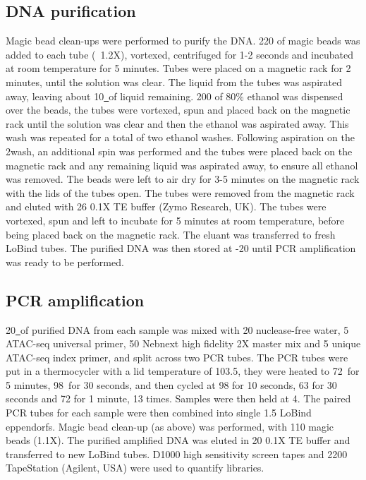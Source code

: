 \subsection{DNA purification}
Magic bead clean-ups were performed to purify the DNA.
220\ul{} of magic beads was added to each tube (~1.2X), vortexed, centrifuged for 1-2 seconds and incubated at room temperature for 5 minutes.
Tubes were placed on a magnetic rack for 2 minutes, until the solution was clear.
The liquid from the tubes was aspirated away, leaving about 10\ul\ of liquid remaining.
200\ul{} of 80\% ethanol was dispensed over the beads, the tubes were vortexed, spun and placed back on the magnetic rack until the solution was clear and then the ethanol was aspirated away.
This wash was repeated for a total of two ethanol washes.
Following aspiration on the 2\nd wash, an additional spin was performed and the tubes were placed back on the magnetic rack and any remaining liquid was aspirated away, to ensure all ethanol was removed.
The beads were left to air dry for 3-5 minutes on the magnetic rack with the lids of the tubes open.
The tubes were removed from the magnetic rack and eluted with 26\ul{} 0.1X TE buffer (Zymo Research, UK).
The tubes were vortexed, spun and left to incubate for 5 minutes at room temperature, before being placed back on the magnetic rack.
The eluant was transferred to fresh LoBind tubes.
The purified DNA was then stored at -20\C{} until PCR amplification was ready to be performed.

\subsection{PCR amplification}
20\ul\ of purified DNA from each sample was mixed with 20\ul{} nuclease-free water, 5\ul{} ATAC-seq universal primer, 50\ul{} Nebnext high fidelity 2X master mix and 5\ul{} unique ATAC-seq index primer, and split across two PCR tubes.
The PCR tubes were put in a thermocycler with a lid temperature of 103.5\C{}, they were heated to 72\C\ for 5 minutes, 98\C\ for 30 seconds, and then cycled at 98\C{} for 10 seconds, 63\C{} for 30 seconds and 72\C{} for 1 minute, 13 times.
Samples were then held at 4\C{}.
The paired PCR tubes for each sample were then combined into single 1.5\ml{} LoBind eppendorfs.
Magic bead clean-up (as above) was performed, with 110\ul{} magic beads (1.1X).
The purified amplified DNA was eluted in 20\ul{} 0.1X TE buffer and transferred to new LoBind tubes.
D1000 high sensitivity screen tapes and 2200 TapeStation (Agilent, USA) were used to quantify libraries.


